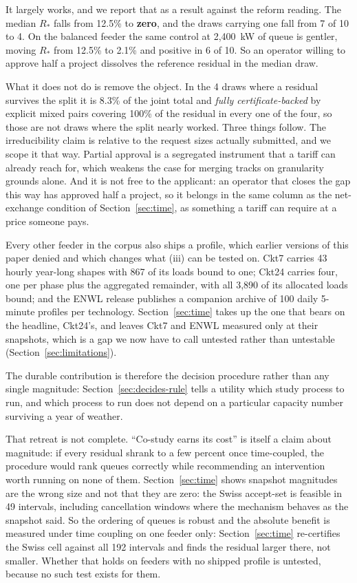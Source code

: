 \documentclass[review,authoryear,12pt]{elsarticle}
\begin{document}
It largely works, and we report that as a result against the reform reading.
The median $R_{\ast}$ falls from 12.5\% to \textbf{zero}, and the draws
carrying one fall from 7 of 10 to 4. On the balanced feeder the same control at
2{,}400~kW of queue is gentler, moving $R_{\ast}$ from 12.5\% to 2.1\% and
positive in 6 of 10. So an operator willing to approve half a project dissolves
the reference residual in the median draw.

What it does not do is remove the object. In the 4 draws where a residual
survives the split it is 8.3\% of the joint total and \emph{fully
certificate-backed} by explicit mixed pairs covering 100\% of the residual in
every one of the four, so those are not draws where the split nearly worked. Three
things follow. The irreducibility claim is relative to the request sizes
actually submitted, and we scope it that way.
Partial approval is a segregated instrument that a tariff can already reach
for, which weakens the case for merging tracks on granularity grounds alone.
And it is not free to the applicant: an operator that closes the gap this way
has approved half a project, so it belongs in the same column as the
net-exchange condition of Section~\ref{sec:time}, as something a tariff can
require at a price someone pays.

Every other feeder in the corpus also ships a profile, which earlier versions
of this paper denied and which changes what (iii) can be tested on. Ckt7
carries 43 hourly year-long shapes with 867 of its loads bound to one; Ckt24
carries four, one per phase plus the aggregated remainder, with all 3{,}890 of
its allocated loads bound; and the ENWL release publishes a companion archive
of 100 daily 5-minute profiles per technology. Section~\ref{sec:time} takes up
the one that bears on the headline, Ckt24's, and leaves Ckt7 and ENWL
measured only at their snapshots, which is a gap we now have to call untested
rather than untestable (Section~\ref{sec:limitations}).

The durable contribution is therefore the decision procedure rather than any
single magnitude: Section~\ref{sec:decides-rule} tells a utility which study
process to run, and which process to run does not depend on a particular
capacity number surviving a year of weather.

That retreat is not complete. ``Co-study earns its cost'' is itself a claim
about magnitude: if every residual shrank to a few percent once time-coupled,
the procedure would rank queues correctly while recommending an intervention
worth running on none of them. Section~\ref{sec:time} shows snapshot magnitudes
are the wrong size and not that they are zero: the Swiss accept-set is feasible
in 49 intervals, including cancellation windows where the mechanism behaves as
the snapshot said. So the ordering of queues is robust and the absolute benefit
is measured under time coupling on one feeder only: Section~\ref{sec:time}
re-certifies the Swiss cell against all 192 intervals and finds the residual
larger there, not smaller. Whether that holds on feeders with no shipped
profile is untested, because no such test exists for them.
\end{document}
